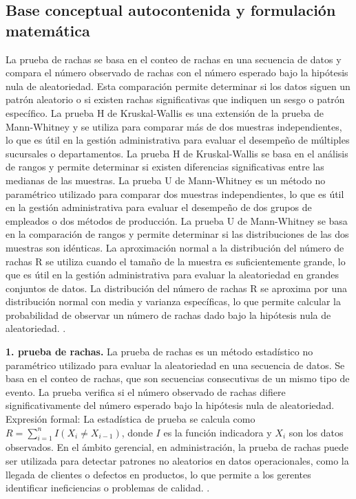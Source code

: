 {\subsection{Base conceptual autocontenida y formulación matemática}
La prueba de rachas se basa en el conteo de rachas en una secuencia de datos y compara el número observado de rachas con el número esperado bajo la hipótesis nula de aleatoriedad. Esta comparación permite determinar si los datos siguen un patrón aleatorio o si existen rachas significativas que indiquen un sesgo o patrón específico. La prueba H de Kruskal-Wallis es una extensión de la prueba de Mann-Whitney y se utiliza para comparar más de dos muestras independientes, lo que es útil en la gestión administrativa para evaluar el desempeño de múltiples sucursales o departamentos. La prueba H de Kruskal-Wallis se basa en el análisis de rangos y permite determinar si existen diferencias significativas entre las medianas de las muestras. La prueba U de Mann-Whitney es un método no paramétrico utilizado para comparar dos muestras independientes, lo que es útil en la gestión administrativa para evaluar el desempeño de dos grupos de empleados o dos métodos de producción. La prueba U de Mann-Whitney se basa en la comparación de rangos y permite determinar si las distribuciones de las dos muestras son idénticas. La aproximación normal a la distribución del número de rachas R se utiliza cuando el tamaño de la muestra es suficientemente grande, lo que es útil en la gestión administrativa para evaluar la aleatoriedad en grandes conjuntos de datos. La distribución del número de rachas R se aproxima por una distribución normal con media y varianza específicas, lo que permite calcular la probabilidad de observar un número de rachas dado bajo la hipótesis nula de aleatoriedad. \citep{wackerly2010,canavos1988,spiegel2009}.

\textbf{1. prueba de rachas.} La prueba de rachas es un método estadístico no paramétrico utilizado para evaluar la aleatoriedad en una secuencia de datos. Se basa en el conteo de rachas, que son secuencias consecutivas de un mismo tipo de evento. La prueba verifica si el número observado de rachas difiere significativamente del número esperado bajo la hipótesis nula de aleatoriedad. Expresión formal: La estadística de prueba se calcula como $R = \sum_{i=1}^{n} I(X_i \neq X_{i-1})$, donde $I$ es la función indicadora y $X_i$ son los datos observados. En el ámbito gerencial, en administración, la prueba de rachas puede ser utilizada para detectar patrones no aleatorios en datos operacionales, como la llegada de clientes o defectos en productos, lo que permite a los gerentes identificar ineficiencias o problemas de calidad. \citep{anderson2012,lind2012,wackerly2010}.

}

